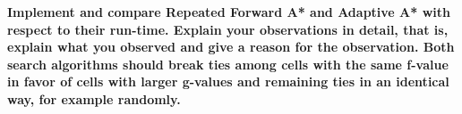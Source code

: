 \documentclass[a4 paper]{article}
\begin{document}
\begin{itemize}
    
    
    
    

\end{itemize}


\newpage
{}

\textbf{\hspace{-15pt}Implement and compare Repeated Forward A* and Adaptive A*
with respect to their run-time. Explain your observations in detail, that is, explain what you observed and give a reason for
the observation. Both search algorithms should break ties among cells with the same f-value in favor of cells with larger
g-values and remaining ties in an identical way, for example randomly.}
\end{document}
